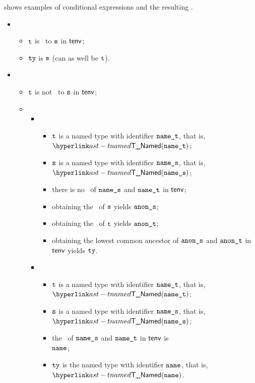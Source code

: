  shows examples of conditional expressions and the resulting
\emph{\Proselca}.
\pagebreak
{}

\ProseParagraph
\OneApplies
\begin{itemize}
  \item {}
  \begin{itemize}
    \item $\texttt{t}$ is \typeequal\ to $\texttt{s}$ in $\textsf{tenv}$;
    \item $\texttt{ty}$ is $\texttt{s}$ (can as well be $\texttt{t}$).
  \end{itemize}

  \item \AllApply
  \begin{itemize}
    \item $\texttt{t}$ is not \typeequal\ to $\texttt{s}$ in $\textsf{tenv}$;
    \item \OneApplies
    \begin{itemize}
      \item {}
      \begin{itemize}
        \item $\texttt{t}$ is a named type with identifier $\texttt{name\_t}$, that is, $\TNamed(\namesubt)$;
        \item $\texttt{s}$ is a named type with identifier $\texttt{name\_s}$, that is, $\TNamed(\namesubs)$;
        \item there is no \namedlowestcommonancestor\ of $\texttt{name\_s}$ and $\texttt{name\_t}$ in $\textsf{tenv}$;
        \item obtaining the \underlyingtype\ of $\texttt{s}$ yields $\texttt{anon\_s}$\ProseOrTypeError;
        \item obtaining the \underlyingtype\ of $\texttt{t}$ yields $\texttt{anon\_t}$\ProseOrTypeError;
        \item obtaining the lowest common ancestor of $\texttt{anon\_s}$ and $\texttt{anon\_t}$ in $\textsf{tenv}$ yields $\texttt{ty}$\ProseOrTypeError.
      \end{itemize}

      \item {}
      \begin{itemize}
        \item $\texttt{t}$ is a named type with identifier $\texttt{name\_t}$, that is, $\TNamed(\namesubt)$;
        \item $\texttt{s}$ is a named type with identifier $\texttt{name\_s}$, that is, $\TNamed(\namesubs)$;
        \item the \namedlowestcommonancestor\ of $\texttt{name\_s}$ and $\texttt{name\_t}$ in $\textsf{tenv}$ is \\
              $\texttt{name}$\ProseOrTypeError;
        \item $\texttt{ty}$ is the named type with identifier $\texttt{name}$, that is, $\TNamed(\name)$.
      \end{itemize}


\end{itemize}
\end{itemize}
\end{itemize}
